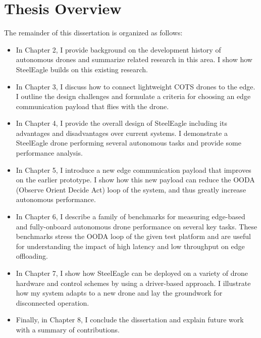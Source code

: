 \section{Thesis Overview}
The remainder of this dissertation is organized as follows:
\begin{itemize}
    \item In Chapter 2, I provide background on the development history of autonomous drones and summarize related research in this area. I show how SteelEagle builds on this existing research.
    \item In Chapter 3, I discuss how to connect lightweight COTS drones to the edge. I outline the design challenges and formulate a criteria for choosing an edge communication payload that flies with the drone.
    \item In Chapter 4, I provide the overall design of SteelEagle including its advantages and disadvantages over current systems. I demonstrate a SteelEagle drone performing several autonomous tasks and provide some performance analysis.
    \item In Chapter 5, I introduce a new edge communication payload that improves on the earlier prototype. I show how this new payload can reduce the OODA (Observe Orient Decide Act) loop of the system, and thus greatly increase autonomous performance.
    \item In Chapter 6, I describe a family of benchmarks for measuring edge-based and fully-onboard autonomous drone performance on several key tasks. These benchmarks stress the OODA loop of the given test platform and are useful for understanding the impact of high latency and low throughput on edge offloading.
    \item In Chapter 7, I show how SteelEagle can be deployed on a variety of drone hardware and control schemes by using a driver-based approach. I illustrate how my system adapts to a new drone and lay the groundwork for disconnected operation.
    \item Finally, in Chapter 8, I conclude the dissertation and explain future work with a summary of contributions.
\end{itemize}

